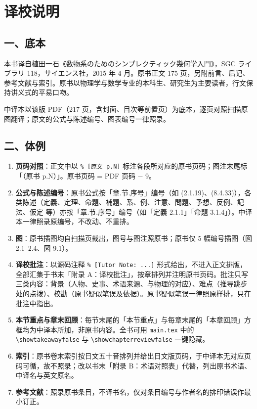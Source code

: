 \chapter*{译校说明}

\section*{一、底本}

本书译自植田一石《数物系のためのシンプレクティック幾何学入門》，SGC ライブラリ 118，サイエンス社，2015 年 4 月。原书正文 175 页，另附前言、后记、参考文献与索引。原书以物理学与数学专业的本科生、研究生为主要读者，行文保持讲义式的平易口吻。

中译本以该版 PDF（217 页，含封面、目次等前置页）为底本，逐页对照扫描原图翻译；原文的公式与陈述编号、图表编号一律照录。

\section*{二、体例}

\begin{enumerate}[label=\arabic*.,leftmargin=2.2em,itemsep=2pt]
  \item \textbf{页码对照}：正文中以 \texttt{\% [原文 p.N]} 标注各段所对应的原书页码；图注末尾标「（原书 p.N）」。原书页码 = PDF 页码 − 9。
  \item \textbf{公式与陈述编号}：原书公式按「章.节.序号」编号（如 (2.1.19)、(8.4.33)），各类陈述（定義、定理、命題、補題、系、例、注意、問題、予想、反例、記法、仮定 等）亦按「章.节.序号」编号（如「定義 2.1.1」「命題 3.1.4」）。中译本一律照录原编号，不改动、不重排。
  \item \textbf{图}：原书插图均自扫描页裁出，图号与图注照原书；原书仅 5 幅编号插图（図 2.1–2.4、図 9.1）。
  \item \textbf{译校批注}：以源码注释 \texttt{\% [Tutor Note: ...]} 形式给出，不进入正文排版，全部汇集于书末「附录 A：译校批注」，按章排列并注明原书页码。批注只写三类内容：背景（人物、史事、术语来源、与物理的对应）、难点（推导跳步处的点拨）、校勘（原书疑似笔误及依据）。原书疑似笔误一律照原样排，只在批注中指出。
  \item \textbf{本节重点与章末回顾}：每节末尾的「本节重点」与每章末尾的「本章回顾」方框均为中译本所加，非原书内容。全书可用 \texttt{main.tex} 中的 \texttt{\textbackslash showtakeawayfalse} 与 \texttt{\textbackslash showchapterreviewfalse} 一键隐藏。
  \item \textbf{索引}：原书卷末索引按日文五十音排列并给出日文版页码，于中译本无对应页码可循，故不照录；改以书末「附录 B：术语对照表」代替，列出原书术语、中译名与英文原名。
  \item \textbf{参考文献}：照录原书条目，不译书名，仅对条目编号与作者名的排印错误作最小订正。
\end{enumerate}

